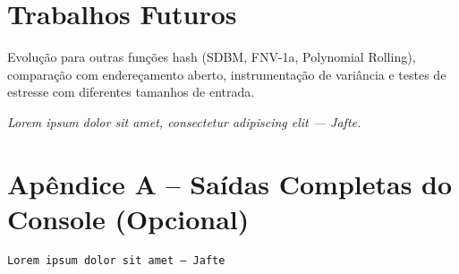 \documentclass[12pt,a4paper]{abntex2}
\newcommand{\placeholderAluno}[1]{\textit{Lorem ipsum dolor sit amet, consectetur adipiscing elit — #1.}}
\begin{document}
\section{Trabalhos Futuros}
Evolução para outras funções hash (SDBM, FNV-1a, Polynomial Rolling), comparação com endereçamento aberto, instrumentação de variância e testes de estresse com diferentes tamanhos de entrada.

\placeholderAluno{Jafte}

\section*{Apêndice A -- Saídas Completas do Console (Opcional)}
\begin{lstlisting}[style=console]
Lorem ipsum dolor sit amet — Jafte
\end{lstlisting}
\end{document}

